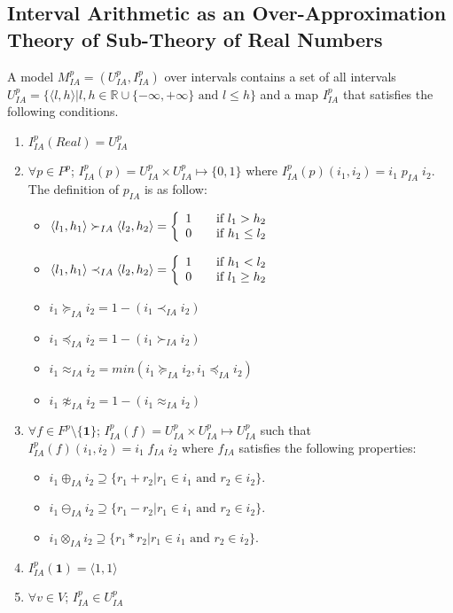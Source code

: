 \subsection{Interval Arithmetic as an Over-Approximation Theory of Sub-Theory of Real Numbers}
A model $M^p_{IA} = (U^p_{IA}, I^p_{IA})$ over intervals contains a set of all intervals $U^p_{IA} = \{\langle l, h\rangle | l, h \in \mathbb{R} \cup \{-\infty, +\infty\} \text{ and } l \le h\}$ and a map $I^p_{IA}$ that satisfies the following conditions.
\begin{enumerate}
\item $I^p_{IA}(Real) = U^p_{IA}$
\item $\forall p \in P^p$; $I^p_{IA}(p)= U^p_{IA} \times U^p_{IA} \mapsto \{0, 1\}$ where $I^p_{IA}(p)(i_1, i_2) = i_1 \; p_{IA} \; i_2$. The definition of $ p_{IA}$ is as follow:
\begin{itemize}
\item $\langle l_1, h_1\rangle  \succ_{IA} \langle l_2,  h_2\rangle  = \left\{ 
  \begin{array}{c l}
    1 & \quad \text{if } l_1 > h_2\\
    0 & \quad \text{if } h_1 \le l_2 \\
  \end{array} \right.$
\item $\langle l_1, h_1\rangle  \prec_{IA} \langle l_2,  h_2\rangle  = \left\{ 
  \begin{array}{c l}
    1 & \quad \text{if } h_1 < l_2\\
    0 & \quad \text{if } l_1 \ge h_2 \\
  \end{array} \right.$
\item $i_1 \succeq_{IA} i_2 = 1 - (i_1 \prec_{IA} i_2)$
\item $i_1 \preceq_{IA} i_2 = 1 - (i_1 \succ_{IA} i_2)$
\item $i_1 \approx_{IA} i_2 = min (i_1 \succeq_{IA} i_2, i_1 \preceq_{IA} i_2)$
\item $i_1 \not\approx_{IA} i_2 = 1 - (i_1 \approx_{IA} i_2)$
\end{itemize}
\item $\forall f \in F^p \setminus \{\mathbf{1}\}$; $I^p_{IA}(f) = U^p_{IA} \times U^p_{IA} \mapsto U^p_{IA}$ such that $ I^p_{IA}(f)(i_1, i_2)= i_1 \; f_{IA} \; i_2$ where $f_{IA}$ satisfies the following properties:
\begin{itemize}
\item $i_1 \oplus_{IA} i_2 \supseteq \{r_1 + r_2| r_1 \in i_1 \text{ and } r_2 \in i_2\}$.
\item $i_1 \ominus_{IA} i_2 \supseteq \{r_1 - r_2| r_1 \in i_1 \text{ and } r_2 \in i_2\}$.
\item $i_1 \otimes_{IA} i_2 \supseteq \{r_1 * r_2| r_1 \in i_1 \text{ and } r_2 \in i_2\}$.
\end{itemize}
\item $I^p_{IA}(\mathbf{1}) = \langle 1,1\rangle $
\item $\forall v \in V$; $I^p_{IA} \in U^p_{IA}$
\end{enumerate}
